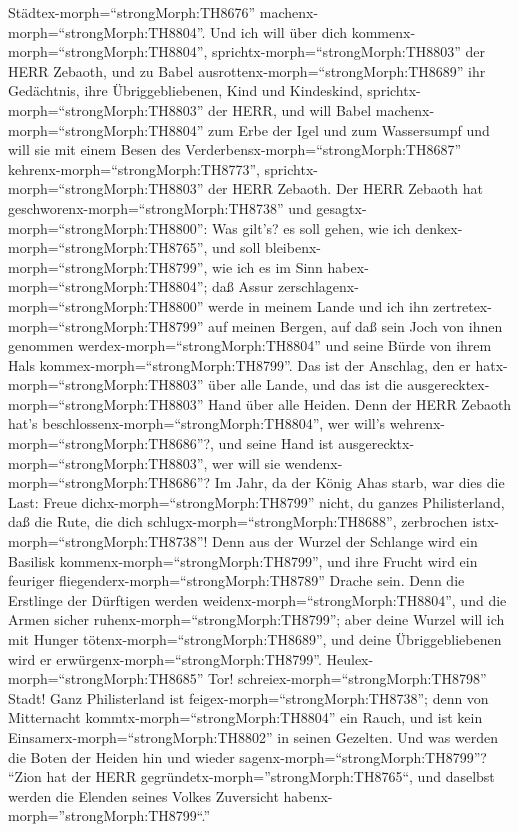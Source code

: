 Städtex-morph=``strongMorph:TH8676''
machenx-morph=``strongMorph:TH8804''.  Und ich will über
dich kommenx-morph=``strongMorph:TH8804'',
sprichtx-morph=``strongMorph:TH8803'' der HERR Zebaoth, und zu Babel
ausrottenx-morph=``strongMorph:TH8689'' ihr Gedächtnis, ihre
Übriggebliebenen, Kind und Kindeskind,
sprichtx-morph=``strongMorph:TH8803'' der HERR,  und will
Babel machenx-morph=``strongMorph:TH8804'' zum Erbe der Igel und zum
Wassersumpf und will sie mit einem Besen des
Verderbensx-morph=``strongMorph:TH8687''
kehrenx-morph=``strongMorph:TH8773'',
sprichtx-morph=``strongMorph:TH8803'' der HERR Zebaoth. 
Der HERR Zebaoth hat geschworenx-morph=``strongMorph:TH8738'' und
gesagtx-morph=``strongMorph:TH8800'': Was gilt's? es soll gehen, wie ich
denkex-morph=``strongMorph:TH8765'', und soll
bleibenx-morph=``strongMorph:TH8799'', wie ich es im Sinn
habex-morph=``strongMorph:TH8804'';  daß Assur
zerschlagenx-morph=``strongMorph:TH8800'' werde in meinem Lande und ich
ihn zertretex-morph=``strongMorph:TH8799'' auf meinen Bergen, auf daß
sein Joch von ihnen genommen werdex-morph=``strongMorph:TH8804'' und
seine Bürde von ihrem Hals kommex-morph=``strongMorph:TH8799''.
 Das ist der Anschlag, den er
hatx-morph=``strongMorph:TH8803'' über alle Lande, und das ist die
ausgerecktex-morph=``strongMorph:TH8803'' Hand über alle Heiden.
 Denn der HERR Zebaoth hat's
beschlossenx-morph=``strongMorph:TH8804'', wer will's
wehrenx-morph=``strongMorph:TH8686''?, und seine Hand ist
ausgerecktx-morph=``strongMorph:TH8803'', wer will sie
wendenx-morph=``strongMorph:TH8686''?  Im Jahr, da der
König Ahas starb, war dies die Last:  Freue
dichx-morph=``strongMorph:TH8799'' nicht, du ganzes Philisterland, daß
die Rute, die dich schlugx-morph=``strongMorph:TH8688'', zerbrochen
istx-morph=``strongMorph:TH8738''! Denn aus der Wurzel der Schlange wird
ein Basilisk kommenx-morph=``strongMorph:TH8799'', und ihre Frucht wird
ein feuriger fliegenderx-morph=``strongMorph:TH8789'' Drache sein.
 Denn die Erstlinge der Dürftigen werden
weidenx-morph=``strongMorph:TH8804'', und die Armen sicher
ruhenx-morph=``strongMorph:TH8799''; aber deine Wurzel will ich mit
Hunger tötenx-morph=``strongMorph:TH8689'', und deine Übriggebliebenen
wird er erwürgenx-morph=``strongMorph:TH8799''. 
Heulex-morph=``strongMorph:TH8685'' Tor!
schreiex-morph=``strongMorph:TH8798'' Stadt! Ganz Philisterland ist
feigex-morph=``strongMorph:TH8738''; denn von Mitternacht
kommtx-morph=``strongMorph:TH8804'' ein Rauch, und ist kein
Einsamerx-morph=``strongMorph:TH8802'' in seinen Gezelten. 
Und was werden die Boten der Heiden hin und wieder
sagenx-morph=``strongMorph:TH8799''? ``Zion hat der HERR
gegründetx-morph=''strongMorph:TH8765``, und daselbst werden die Elenden
seines Volkes Zuversicht habenx-morph=''strongMorph:TH8799``.''

